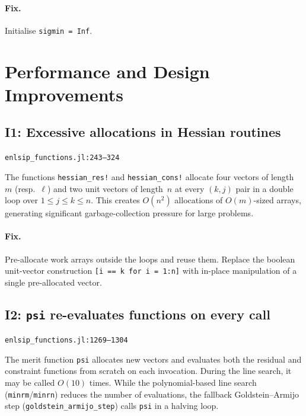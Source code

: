 \documentclass[11pt, a4paper]{article}
\newcommand{\juliaref}[2]{\texttt{#1:#2}}
\begin{document}
\paragraph{Fix.}
Initialise \texttt{sigmin = Inf}.

\section{Performance and Design Improvements}
\label{sec:improvements}

\subsection{I1: Excessive allocations in Hessian routines}
\label{sec:i1}

\juliaref{enlsip\_functions.jl}{243--324}

The functions \texttt{hessian\_res!} and \texttt{hessian\_cons!}
allocate four vectors of length~$m$ (resp.~$\ell$) and two unit vectors
of length~$n$ at every $(k,j)$ pair in a double loop over
$1 \leq j \leq k \leq n$.  This creates $O(n^2)$ allocations of
$O(m)$-sized arrays, generating significant garbage-collection pressure
for large problems.

\paragraph{Fix.}
Pre-allocate work arrays outside the loops and reuse them.  Replace
the boolean unit-vector construction \texttt{[i == k for i = 1:n]} with
in-place manipulation of a single pre-allocated vector.

\subsection{I2: \texttt{psi} re-evaluates functions on every call}
\label{sec:i2}

\juliaref{enlsip\_functions.jl}{1269--1304}

The merit function \texttt{psi} allocates new vectors and evaluates both
the residual and constraint functions from scratch on each invocation.
During the line search, it may be called $O(10)$ times.  While the
polynomial-based line search (\texttt{minrm}/\texttt{minrn}) reduces the
number of evaluations, the fallback Goldstein--Armijo step
(\texttt{goldstein\_armijo\_step}) calls \texttt{psi} in a halving loop.
\end{document}
